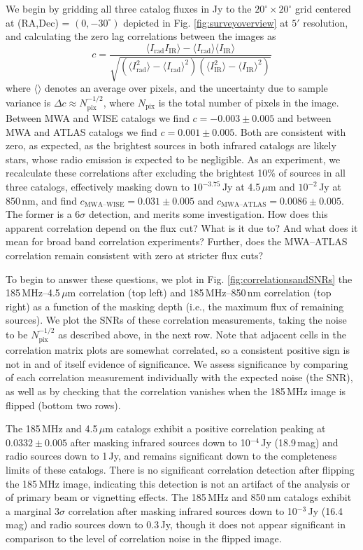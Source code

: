 \documentclass{emulateapj}
\newcommand{\rad}{\text{rad}}
\newcommand{\IR}{\text{IR}}
\begin{document}
We begin by gridding all three catalog fluxes in Jy to the $20^\circ\times20^\circ$ grid centered at (RA,Dec) = $(0, -30^\circ)$ depicted in Fig. \ref{fig:surveyoverview} at $5'$ resolution, and calculating the zero lag correlations between the images as
\begin{equation}
\label{eqn:imagecorrdef}
	c = \frac{\langle I_\rad I_\IR\rangle-\langle I_\rad\rangle\langle I_\IR\rangle}{\sqrt{(\langle I_\rad^2\rangle -\langle I_\rad\rangle^2)(\langle I_\IR^2\rangle -\langle I_\IR\rangle^2)}}
\end{equation}
where $\langle\rangle$ denotes an average over pixels, and the uncertainty due to sample variance is $\Delta c\approx N_\text{pix}^{-1/2}$, where $N_\text{pix}$ is the total number of pixels in the image. Between MWA and WISE catalogs we find $c=-0.003\pm0.005$ and between MWA and ATLAS catalogs we find $c=0.001\pm0.005$. Both are consistent with zero, as expected, as the brightest sources in both infrared catalogs are likely stars, whose radio emission is expected to be negligible. As an experiment, we recalculate these correlations after excluding the brightest 10\% of sources in all three catalogs, effectively masking down to $10^{-3.75}$\,Jy at 4.5\,$\mu$m and $10^{-2}$\,Jy at 850\,nm, and find $c_\text{MWA--WISE}=0.031\pm0.005$ and $c_\text{MWA--ATLAS}=0.0086\pm0.005$. The former is a $6\sigma$ detection, and merits some investigation. How does this apparent correlation depend on the flux cut? What is it due to? And what does it mean for broad band correlation experiments? Further, does the MWA--ATLAS correlation remain consistent with zero at stricter flux cuts?

To begin to answer these questions, we plot in Fig. \ref{fig:correlationsandSNRs} the 185\,MHz--4.5\,$\mu$m correlation (top left) and 185\,MHz--850\,nm correlation (top right) as a function of the masking depth (i.e., the maximum flux of remaining sources). We plot the SNRs of these correlation measurements, taking the noise to be $N_\text{pix}^{-1/2}$ as described above, in the next row. Note that adjacent cells in the correlation matrix plots are somewhat correlated, so a consistent positive sign is not in and of itself evidence of significance. We assess significance by comparing of each correlation measurement individually with the expected noise (the SNR), as well as by checking that the correlation vanishes when the 185\,MHz image is flipped (bottom two rows). 

The 185\,MHz and 4.5\,$\mu$m catalogs exhibit a positive correlation peaking at $0.0332\pm0.005$ after masking infrared sources down to 10$^{-4}$\,Jy (18.9\,mag) and radio sources down to 1\,Jy, and remains significant down to the completeness limits of these catalogs. There is no significant correlation detection after flipping the 185\,MHz image, indicating this detection is not an artifact of the analysis or of primary beam or vignetting effects. The 185\,MHz and 850\,nm catalogs exhibit a marginal $3\sigma$ correlation after masking infrared sources down to 10$^{-3}$\,Jy (16.4\,mag) and radio sources down to 0.3\,Jy, though it does not appear significant in comparison to the level of correlation noise in the flipped image.
\end{document}

